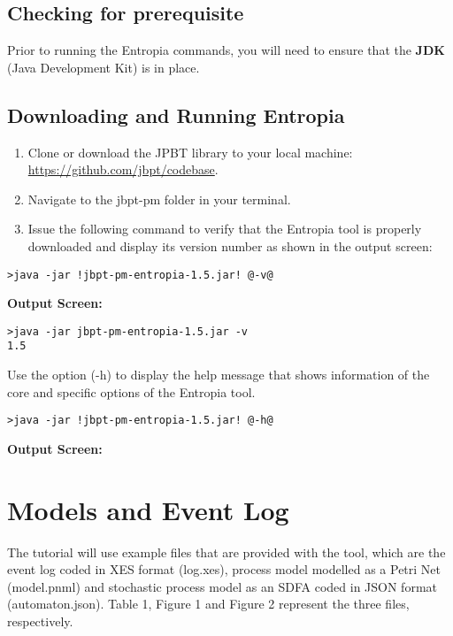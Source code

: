 \documentclass{article}
\begin{document}
\subsection{Checking for prerequisite}
Prior to running the Entropia commands, you will need to ensure that the \textbf{JDK} (Java Development Kit) is in place.
\subsection{Downloading and Running Entropia}

\begin{enumerate}
\itemsep0em 
\item Clone or download the JPBT library to your local machine: \url{https://github.com/jbpt/codebase}.
\item Navigate to the jbpt-pm folder in your terminal.
\item Issue the following command to verify that the Entropia tool is properly downloaded and display its version number as shown in the output screen:
\end{enumerate}
\begin{lstlisting}[style=CL]
>java -jar !jbpt-pm-entropia-1.5.jar! @-v@
\end{lstlisting}
\textbf{Output Screen:}
\begin{lstlisting}[style=DOS]
>java -jar jbpt-pm-entropia-1.5.jar -v
1.5
\end{lstlisting}
\smallbreak
Use the option (\textcolor{darkcandyapplered}{\footnotesize\ttfamily-h}) to display the help message that shows information of the core and specific options of the Entropia tool.
\begin{lstlisting}[style=CL]
>java -jar !jbpt-pm-entropia-1.5.jar! @-h@
\end{lstlisting}
\textbf{Output Screen:}%


\section*{Models and Event Log}
The tutorial will use example files that are provided with the tool, which are the event log coded in XES format (log.xes), process model modelled as a Petri Net (model.pnml) and stochastic process model as an SDFA coded in JSON format (automaton.json). Table 1, Figure 1 and Figure 2 represent the three files, respectively. 
\end{document}
